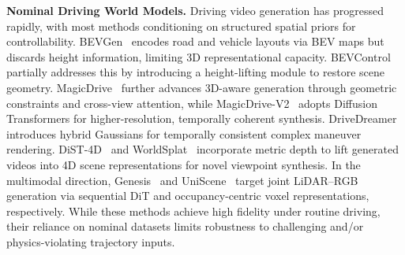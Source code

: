 \documentclass[runningheads]{llncs}
\begin{document}
\textbf{Nominal Driving World Models.} Driving video generation has progressed rapidly, with most methods conditioning on structured spatial priors for controllability. BEVGen~\cite{bevgen} encodes road and vehicle layouts via BEV maps but discards height information, limiting 3D representational capacity. BEVControl~\cite{bevcontrol} partially addresses this by introducing a height-lifting module to restore scene geometry. MagicDrive~\cite{gao2023magicdrive} further advances 3D-aware generation through geometric constraints and cross-view attention, while MagicDrive-V2~\cite{gao2025magicdrive} adopts Diffusion Transformers for higher-resolution, temporally coherent synthesis. DriveDreamer~\cite{wang2024drivedreamer} introduces hybrid Gaussians for temporally consistent complex maneuver rendering. DiST-4D~\cite{guo2025dist}  and WorldSplat~\cite{zhu2025worldsplat} incorporate metric depth to lift generated videos into 4D scene representations for novel viewpoint synthesis. In the multimodal direction, Genesis~\cite{guo2025genesis} and UniScene~\cite{li2024uniscene} target joint LiDAR--RGB generation via sequential DiT and occupancy-centric voxel representations, respectively. 
While these methods achieve high fidelity under routine driving, their reliance on nominal datasets limits robustness to challenging and/or physics-violating trajectory inputs.
\end{document}
